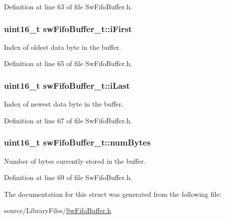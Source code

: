 Definition at line 63 of file Sw\+Fifo\+Buffer.\+h.

\hypertarget{structsw_fifo_buffer__t_a407513a78db2ae65a38a95646668164e}{}
\subsubsection[{i\+First}]{\setlength{\rightskip}{0pt plus 5cm}uint16\+\_\+t sw\+Fifo\+Buffer\+\_\+t\+::i\+First}\label{structsw_fifo_buffer__t_a407513a78db2ae65a38a95646668164e}
Index of oldest data byte in the buffer. 

Definition at line 65 of file Sw\+Fifo\+Buffer.\+h.

\hypertarget{structsw_fifo_buffer__t_a37b7c86bf28a0d6c402cd80d41a7abd1}{}
\subsubsection[{i\+Last}]{\setlength{\rightskip}{0pt plus 5cm}uint16\+\_\+t sw\+Fifo\+Buffer\+\_\+t\+::i\+Last}\label{structsw_fifo_buffer__t_a37b7c86bf28a0d6c402cd80d41a7abd1}
Index of newest data byte in the buffer. 

Definition at line 67 of file Sw\+Fifo\+Buffer.\+h.

\hypertarget{structsw_fifo_buffer__t_a05db6308e5fee7d2591c4bc4e21505da}{}
\subsubsection[{num\+Bytes}]{\setlength{\rightskip}{0pt plus 5cm}uint16\+\_\+t sw\+Fifo\+Buffer\+\_\+t\+::num\+Bytes}\label{structsw_fifo_buffer__t_a05db6308e5fee7d2591c4bc4e21505da}
Number of bytes currently stored in the buffer. 

Definition at line 69 of file Sw\+Fifo\+Buffer.\+h.



The documentation for this struct was generated from the following file\+:\begin{DoxyCompactItemize}
\item 
source/\+Library\+Files/\hyperlink{_sw_fifo_buffer_8h}{Sw\+Fifo\+Buffer.\+h}\end{DoxyCompactItemize}
